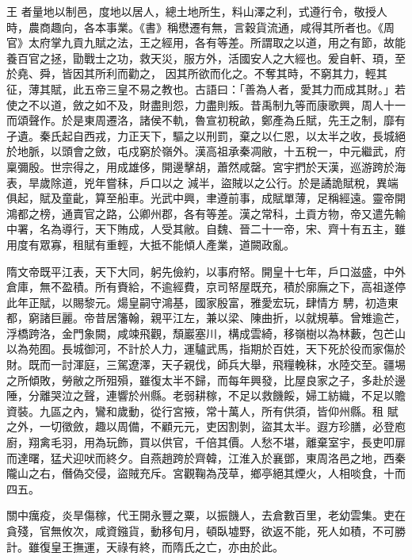 
\begin{pinyinscope}

 王
 者量地以制邑，度地以居人，總土地所生，料山澤之利，式遵行令，敬授人時，農商趣向，各本事業。《書》稱懋遷有無，言穀貨流通，咸得其所者也。《周官》太府掌九貢九賦之法，王之經用，各有等差。所謂取之以道，用之有節，故能養百官之拯，勖戰士之功，救天災，服方外，活國安人之大經也。爰自軒、頊，至於堯、舜，皆因其所利而勸之，
 因其所欲而化之。不奪其時，不窮其力，輕其征，薄其賦，此五帝三皇不易之教也。古語曰：「善為人者，愛其力而成其財。」若使之不以道，斂之如不及，財盡則怨，力盡則叛。昔禹制九等而康歌興，周人十一而頌聲作。於是東周遷洛，諸侯不軌，魯宣初稅畝，鄭產為丘賦，先王之制，靡有孑遺。秦氏起自西戎，力正天下，驅之以刑罰，棄之以仁恩，以太半之收，長城絕於地脈，以頭會之斂，屯戍窮於嶺外。漢高祖承秦凋敝，十五稅一，中元繼武，府稟彌殷。世宗得之，用成雄侈，開邊擊胡，蕭然咸罄。宮宇捫於天漢，巡游跨於海表，旱歲除道，兇年嘗秣，戶口以之
 減半，盜賊以之公行。於是譎詭賦稅，異端俱起，賦及童齔，算至船車。光武中興，聿遵前事，成賦單薄，足稱經遠。靈帝開鴻都之榜，通賣官之路，公卿州郡，各有等差。漢之常科，土貢方物，帝又遣先輸中署，名為導行，天下賄成，人受其敝。自魏、晉二十一帝，宋、齊十有五主，雖用度有眾寡，租賦有重輕，大抵不能傾人產業，道闕政亂。



 隋文帝既平江表，天下大同，躬先儉約，以事府帑。開皇十七年，戶口滋盛，中外倉庫，無不盈積。所有賚給，不逾經費，京司帑屋既充，積於廓廡之下，高祖遂停此年正賦，以賜黎元。煬皇嗣守鴻基，國家殷富，雅愛宏玩，肆情方
 騁，初造東都，窮諸巨麗。帝昔居籓翰，親平江左，兼以梁、陳曲折，以就規摹。曾雉逾芒，浮橋跨洛，金門象闕，咸竦飛觀，頹巖塞川，構成雲綺，移嶺樹以為林藪，包芒山以為苑囿。長城御河，不計於人力，運驢武馬，指期於百姓，天下死於役而家傷於財。既而一討渾庭，三駕遼澤，天子親伐，師兵大舉，飛糧輓秣，水陸交至。疆埸之所傾敗，勞敝之所殂殞，雖復太半不歸，而每年興發，比屋良家之子，多赴於邊陲，分離哭泣之聲，連響於州縣。老弱耕稼，不足以救饑餒，婦工紡織，不足以贍資裝。九區之內，鸞和歲動，從行宮掖，常十萬人，所有供須，皆仰州縣。租
 賦之外，一切徵斂，趣以周備，不顧元元，吏因割剝，盜其太半。遐方珍膳，必登庖廚，翔禽毛羽，用為玩飾，買以供官，千倍其價。人愁不堪，離棄室宇，長吏叩扉而達曙，猛犬迎吠而終夕。自燕趙跨於齊韓，江淮入於襄鄧，東周洛邑之地，西秦隴山之右，僭偽交侵，盜賊充斥。宮觀鞠為茂草，鄉亭絕其煙火，人相啖食，十而四五。



 關中癘疫，炎旱傷稼，代王開永豐之粟，以振饑人，去倉數百里，老幼雲集。吏在貪殘，官無攸次，咸資鏹貨，動移旬月，頓臥墟野，欲返不能，死人如積，不可勝計。雖復皇王撫運，天祿有終，而隋氏之亡，亦由於此。




\end{pinyinscope}
